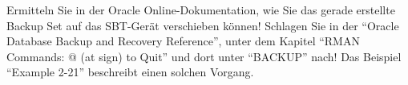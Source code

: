     \item Ermitteln Sie in der Oracle Online-Dokumentation, wie Sie das gerade
    erstellte Backup Set auf das SBT-Gerät verschieben können! Schlagen Sie
    in der \enquote{Oracle Database Backup and Recovery Reference}, unter dem
    Kapitel \enquote{RMAN Commands: @ (at sign) to Quit} und dort unter
    \enquote{BACKUP} nach! Das Beispiel \enquote{Example 2-21} beschreibt einen
    solchen Vorgang.
